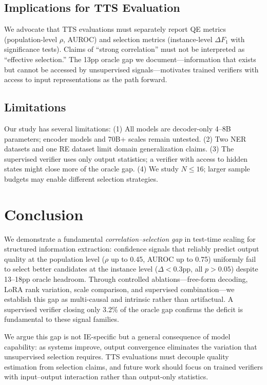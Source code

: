 \documentclass[11pt]{article}
\begin{document}
\subsection{Implications for TTS Evaluation}

We advocate that TTS evaluations must separately report QE metrics (population-level $\rho$, AUROC) and selection metrics (instance-level $\Delta F_1$ with significance tests). Claims of ``strong correlation'' must not be interpreted as ``effective selection.'' The 13pp oracle gap we document---information that exists but cannot be accessed by unsupervised signals---motivates trained verifiers with access to input representations as the path forward.

\subsection{Limitations}

Our study has several limitations: (1) All models are decoder-only 4--8B parameters; encoder models and 70B+ scales remain untested. (2) Two NER datasets and one RE dataset limit domain generalization claims. (3) The supervised verifier uses only output statistics; a verifier with access to hidden states might close more of the oracle gap. (4) We study $N \leq 16$; larger sample budgets may enable different selection strategies.

\section{Conclusion}

We demonstrate a fundamental \emph{correlation--selection gap} in test-time scaling for structured information extraction: confidence signals that reliably predict output quality at the population level ($\rho$ up to 0.45, AUROC up to 0.75) uniformly fail to select better candidates at the instance level ($\Delta < 0.3$pp, all $p > 0.05$) despite 13--18pp oracle headroom. Through controlled ablations---free-form decoding, LoRA rank variation, scale comparison, and supervised combination---we establish this gap as multi-causal and intrinsic rather than artifactual. A supervised verifier closing only 3.2\% of the oracle gap confirms the deficit is fundamental to these signal families.

We argue this gap is not IE-specific but a general consequence of model capability: as systems improve, output convergence eliminates the variation that unsupervised selection requires. TTS evaluations must decouple quality estimation from selection claims, and future work should focus on trained verifiers with input--output interaction rather than output-only statistics.
\end{document}
